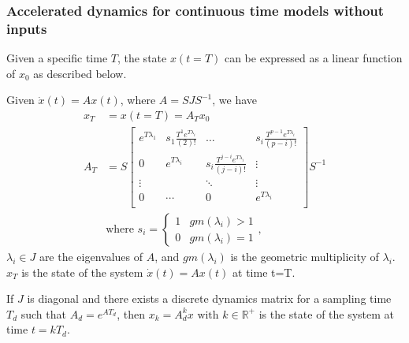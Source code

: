 \documentclass[sigconf]{llncs}
\newcommand{\mat}[1]{{#1}}
\renewcommand{\vec}[1]{{#1}}
\begin{document}
 \subsubsection{Accelerated dynamics for continuous time models without inputs}\label{sec:cont_acc_no_inputs}
 Given a specific time $T$, the state $\vec{x}(t=T)$ can be expressed as a linear function of $\vec{x}_0$ as described below.
 
 \begin{theorem}
 Given $\dot{\vec{x}}(t)=\mat{A}\vec{x}(t)$, where $\mat{A}=\mat{S}\mat{J}\mat{S}^{-1}$, we have
 \begin{align}
 \vec{x}_T&=\vec{x}(t=T)=\mat{A}_{T}\vec{x}_0\\
 \mat{A}_{T}&= \mat{S}
 \left [ \begin{array}{cccc}
 e^{T\lambda_1}  & s_1\frac{T^{1}e^{T\lambda_i}}{(2)!} & \hdots  & s_i\frac{T^{p-1}e^{T\lambda_i}}{(p-i)!} \\
0 & e^{T\lambda_i}  & s_i\frac{T^{j-i}e^{T\lambda_i}}{(j-i)!} & \vdots \\
\vdots & & \ddots & \vdots \\
0 & \cdots & 0  &e^{T\lambda_i} \\
\end{array} \right ]
 \mat{S}^{-1}
 \label{eq:continuous_tube_dyn}\\
 &\text{where } s_i=\left\{\begin{array}{cc}1&gm(\lambda_i)>1\\0&gm(\lambda_i)=1\end{array}\right.,\nonumber
 \end{align}
$\lambda_i \in \mat{J}$ are the eigenvalues of $\mat{A}$, and $gm(\lambda_i)$ is the geometric multiplicity of $\lambda_i$.  
$\vec{x}_T$ is the state of the system $\dot{\vec{x}}(t)=\mat{A}\vec{x}(t)$ at time t=T.
 \end{theorem}
 \begin{corollary}
 If $\mat{J}$ is diagonal and there exists a discrete dynamics matrix for a sampling time $T_d$ such that $A_d=e^{\mat{A} T_d}$, then $\vec{x}_k=A_d^k\vec{x} \text{ with } k \in \mathbb{R}^+$ is the state of the system at time $t=kT_d$.
 \end{corollary}
\end{document}
